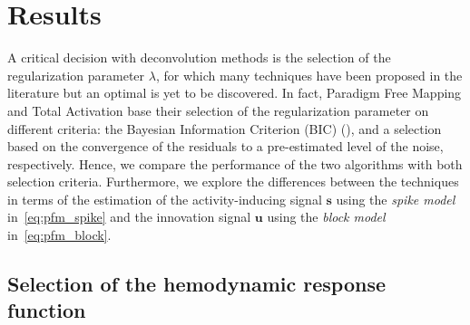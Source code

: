 \section{Results}


A critical decision with deconvolution methods is the selection of the regularization parameter \(\lambda\), for which many techniques have been proposed in the literature but an optimal is yet to be discovered. In fact, Paradigm Free Mapping and Total Activation base their selection of the regularization parameter on different criteria: the Bayesian Information Criterion (BIC) (\citealt{schwarz1978EstimatingDimensionModel}), and a selection based on the convergence of the residuals to a pre-estimated level of the noise, respectively. Hence, we compare the performance of the two algorithms with both selection criteria. Furthermore, we explore the differences between the techniques in terms of the estimation of the activity-inducing signal \(\mathbf{s}\) using the \textit{spike model} in~\eqref{eq:pfm_spike} and the innovation signal \(\mathbf{u}\) using the \textit{block model} in~\eqref{eq:pfm_block}.

\subsection{Selection of the hemodynamic response function}

